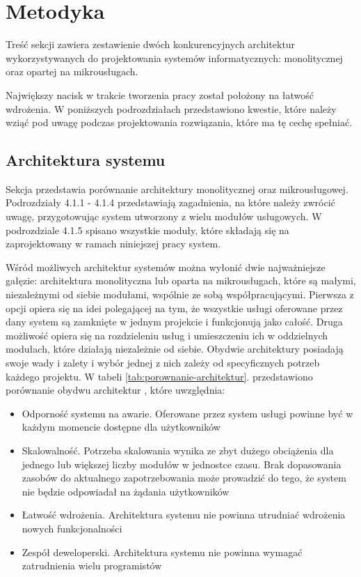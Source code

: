 \clearpage
\section{Metodyka}
Treść sekcji zawiera zestawienie dwóch konkurencyjnych architektur wykorzystywanych do
projektowania systemów informatycznych: monolitycznej oraz opartej na mikrousługach.

Największy nacisk w trakcie tworzenia pracy został położony na łatwość wdrożenia. 
W poniższych podrozdziałach przedstawiono kwestie, które należy wziąć pod uwagę
podczas projektowania rozwiązania, które ma tę cechę spełniać.

\subsection{Architektura systemu}
Sekcja przedstawia porównanie architektury monolitycznej oraz mikrousługowej.
Podrozdziały 4.1.1 - 4.1.4 przedstawiają zagadnienia, na które należy zwrócić
uwagę, przygotowując system utworzony z wielu modułów usługowych. W podrozdziale 4.1.5
spisano wszystkie moduły, które składają się na zaprojektowany w ramach niniejszej pracy 
system.

Wśród możliwych architektur systemów można wyłonić dwie najważniejsze gałęzie: 
architektura monolityczna lub oparta na mikrousługach, które są małymi, niezależnymi 
od siebie modułami, wspólnie ze sobą współpracującymi. Pierwsza z opcji opiera się 
na idei polegającej na tym, że wszystkie usługi oferowane przez dany system są zamknięte 
w jednym projekcie i funkcjonują jako całość. Druga możliwość opiera się na 
rozdzieleniu usług i umieszczeniu ich w oddzielnych modułach, które działają 
niezależnie od siebie. Obydwie architektury posiadają swoje wady i zalety i wybór 
jednej z nich zależy od specyficznych potrzeb każdego projektu. W tabeli 
\ref{tab:porownanie-architektur}. przedstawiono porównanie obydwu architektur 
\cite{newmanb2015}, które uwzględnia:

\begin{itemize} %
    \item Odporność systemu na awarie. Oferowane przez system usługi powinne być w każdym 
    momencie dostępne dla użytkowników
    \item Skalowalność. Potrzeba skalowania wynika ze zbyt dużego obciążenia dla jednego 
    lub większej liczby modułów w jednostce czasu. Brak dopasowania zasobów do 
    aktualnego zapotrzebowania może prowadzić do tego, że system nie będzie odpowiadał 
    na żądania użytkowników
    \item Łatwość wdrożenia. Architektura systemu nie powinna utrudniać wdrożenia nowych 
    funkcjonalności
    \item Zespół deweloperski. Architektura systemu nie powinna wymagać zatrudnienia 
    wielu programistów
\end{itemize}

